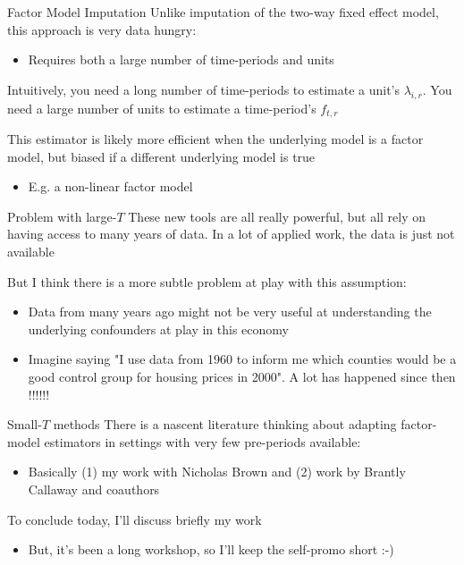 \documentclass[t]{beamer}
\begin{document}
\begin{frame}{Factor Model Imputation}
  Unlike imputation of the two-way fixed effect model, this approach is very data hungry:
  \begin{itemize}
    \item Requires both a large number of time-periods and units
  \end{itemize}

  \bigskip
  Intuitively, you need a long number of time-periods to estimate a unit's $\lambda_{i,r}$. You need a large number of units to estimate a time-period's $f_{t,r}$

  \pause
  \bigskip
  This estimator is likely more efficient when the underlying model is a factor model, but biased if a different underlying model is true
  \begin{itemize}
    \item E.g. a non-linear factor model
  \end{itemize}
\end{frame}

\begin{frame}{Problem with large-$T$}
  These new tools are all really powerful, but all rely on having access to many years of data.
  In a lot of applied work, the data is just not available

  \pause
  \bigskip
  But I think there is a more subtle problem at play with this assumption: 
  \begin{itemize}
    \item Data from many years ago might not be very useful at understanding the underlying confounders at play in this economy
    \item Imagine saying "I use data from 1960 to inform me which counties would be a good control group for housing prices in 2000". A lot has happened since then !!!!!!
  \end{itemize}
\end{frame}

\begin{frame}{Small-$T$ methods}
  There is a nascent literature thinking about adapting factor-model estimators in settings with very few pre-periods available:
  \begin{itemize}
    \item Basically (1) my work with Nicholas Brown and (2) work by Brantly Callaway and coauthors
  \end{itemize}

  \bigskip
  To conclude today, I'll discuss briefly my work
  \begin{itemize}
    \item But, it's been a long workshop, so I'll keep the self-promo short :-)
  \end{itemize}
\end{frame}
\end{document}

